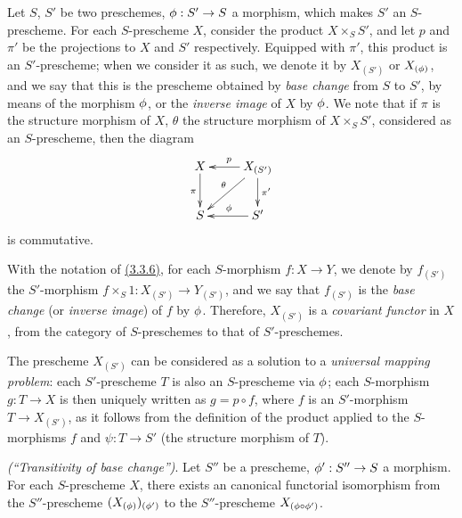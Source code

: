 \begin{env}[3.3.6]
\label{env-1.3.3.6}
Let $S$, $S'$ be two preschemes, $\phi:S'\to S$ a morphism, which makes $S'$ an
$S$-prescheme. For each $S$-prescheme $X$, consider the product $X\times_S S'$,
and let $p$ and $\pi'$ be the projections to $X$ and $S'$ respectively. Equipped
with $\pi'$, this product is an $S'$-prescheme; when we consider it as such, we
denote it by $X_{(S')}$ or $X_{(\phi)}$, and we say that this is the prescheme
obtained by {\em base change} from $S$ to $S'$, by means of the morphism
$\phi$, or the {\em inverse image} of $X$ by $\phi$. We note that if $\pi$ is
the structure morphism of $X$, $\theta$ the structure morphism of
$X\times_S S'$, considered as an $S$-prescheme, then the diagram
\[
  \xymatrix{
    X\ar[d]_\pi &
    X_{(S')}\ar[l]_p\ar[ld]_\theta\ar[d]^{\pi'}\\
    S &
    S'\ar[l]_\vphi
  }
\]
is commutative.
\end{env}

\begin{env}[3.3.7]
\label{env-1.3.3.7}
With the notation of \hyperref[env-1.3.3.6]{(3.3.6)}, for each $S$-morphism $f:X\to Y$, we
denote by $f_{(S')}$ the $S'$-morphism $f\times_S 1:X_{(S')}\to Y_{(S')}$, and
we say that $f_{(S')}$ is the {\em base change} (or {\em inverse image}) of
$f$ by $\phi$. Therefore, $X_{(S')}$ is a {\em covariant functor} in $X$, from
the category of $S$-preschemes to that of $S'$-preschemes.
\end{env}

\begin{env}[3.3.8]
\label{env-1.3.3.8}
The prescheme $X_{(S')}$ can be considered as a solution to a {\em universal
mapping problem}: each $S'$-prescheme $T$ is also an $S$-prescheme via $\phi$;
each $S$-morphism $g:T\to X$ is then uniquely written as $g=p\circ f$, where $f$
is an $S'$-morphism $T\to X_{(S')}$, as it follows from the definition of the
product applied to the $S$-morphisms $f$ and $\psi:T\to S'$ (the structure
morphism of $T$).
\end{env}

\begin{prop}[3.3.9]
\label{prop-1.3.3.9}
{\em (``Transitivity of base change'')}. Let $S''$ be a prescheme,
$\phi':S''\to S$ a morphism. For each $S$-prescheme $X$, there exists an
canonical functorial isomorphism from the $S''$-prescheme
$(X_{(\phi)})_{(\phi')}$ to the $S''$-prescheme $X_{(\phi\circ\phi')}$.
\end{prop}

